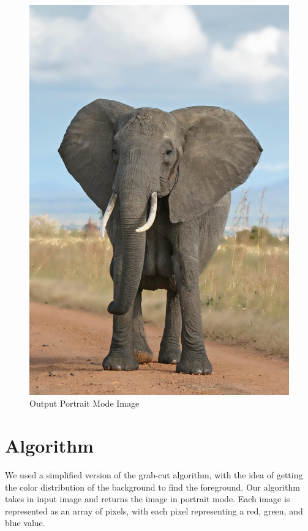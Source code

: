 \documentclass[12pt]{article}
\begin{document}
\begin{figure}[!htb]
\begin{minipage}{0.48\textwidth}
        \includegraphics[width=0.9\linewidth]{large_elephant_portrait.jpg}
        \caption{Output Portrait Mode Image}
    \end{minipage}\hfill
\end{figure}

\section{Algorithm}

We used a simplified version of the grab-cut algorithm, with the idea of getting
the color distribution of the background to find the foreground.
Our algorithm takes in input image and returns the image in portrait mode.
Each image is represented as an array of pixels, with each pixel representing
a red, green, and blue value.
\end{document}
